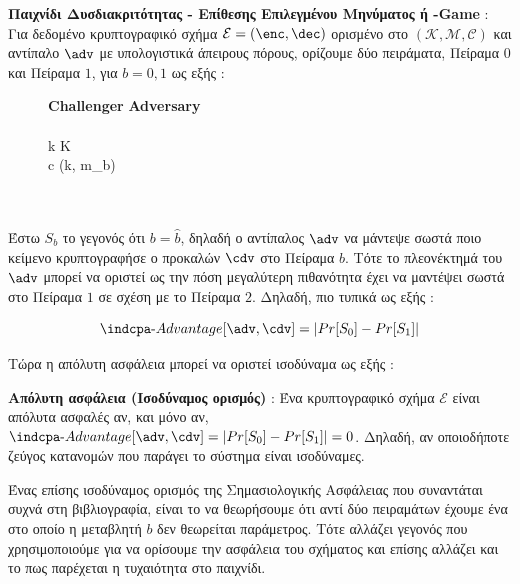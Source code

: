 \begin{definition}
\textbf{Παιχνίδι Δυσδιακριτότητας - Επίθεσης Επιλεγμένου Μηνύματος ή \indcpa-Game } : Για δεδομένο κρυπτογραφικό σχήμα $\mathcal{E}=(\enc,\dec)$ ορισμένο στο $(\mathcal{K}, \mathcal{M}, \mathcal{C})$ και αντίπαλο $\adv$ με υπολογιστικά άπειρους πόρους, ορίζουμε δύο πειράματα, Πείραμα $0$ και Πείραμα $1$, για $b=0,1$ ως εξής :

\begin{figure}[H]
\begin{pchstack}
     {
    \textbf{Challenger \cdv} \< \< \textbf{Adversary \adv} \\
    \<  \< \\
    k \sample K \< \< \\
    c \sample \enc(k, m_b) \< \< \\
    \<  \< \\
    \< \\
    }
\end{pchstack}
\label{fig:ind_game1}
\end{figure}

Έστω $S_b$ το γεγονός ότι $b = \hat{b}$, δηλαδή ο αντίπαλος $\adv$ να μάντεψε σωστά ποιο κείμενο κρυπτογραφήσε ο προκαλών $\cdv$ στο Πείραμα $b$. Τότε το πλεονέκτημά του $\adv$ μπορεί να οριστεί ως την πόση μεγαλύτερη πιθανότητα έχει να μαντέψει σωστά στο Πείραμα $1$ σε σχέση με το Πείραμα $2$. Δηλαδή, πιο τυπικά ως εξής :

\begin{equation}
    \indcpa\text{-}Advantage[\adv, \cdv] = | Pr[S_0] - Pr[S_1] |
\end{equation}
\end{definition}

Τώρα η απόλυτη ασφάλεια μπορεί να οριστεί ισοδύναμα ως εξής :

\begin{definition}
\label{def:perfect_security_1}
\textbf{Απόλυτη ασφάλεια (Ισοδύναμος ορισμός)} : Ένα κρυπτογραφικό σχήμα $\mathcal{E}$ είναι απόλυτα ασφαλές αν, και μόνο αν, $\indcpa\text{-}Advantage[\adv, \cdv] = | Pr[S_0] - Pr[S_1] | = 0$. Δηλαδή, αν οποιοδήποτε ζεύγος κατανομών που παράγει το σύστημα είναι ισοδύναμες.
\end{definition}

Ένας επίσης ισοδύναμος ορισμός της Σημασιολογικής Ασφάλειας που συναντάται συχνά στη βιβλιογραφία, είναι το να θεωρήσουμε ότι αντί δύο πειραμάτων έχουμε ένα στο οποίο η μεταβλητή $b$ δεν θεωρείται παράμετρος. Τότε αλλάζει γεγονός που χρησιμοποιούμε για να ορίσουμε την ασφάλεια του σχήματος και επίσης αλλάζει και το πως παρέχεται η τυχαιότητα στο παιχνίδι.

